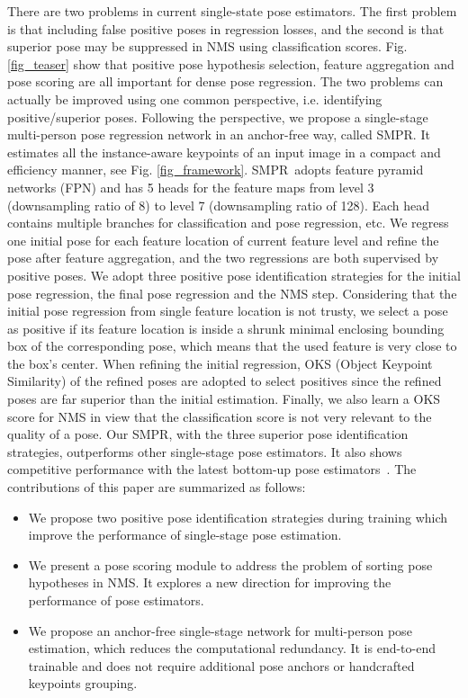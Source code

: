 \documentclass[11pt,twocolumn,journal]{IEEEtran}
\newcommand{\fig}{Fig. }
\newcommand{\SMPR}{SMPR}
\begin{document}
There are two problems in current single-state pose estimators. The first problem is that including false positive poses in regression losses, and the second is that superior pose may be suppressed in NMS using classification scores. 
\fig \ref{fig_teaser} show that positive pose hypothesis selection, feature aggregation and pose scoring are all important for dense pose regression. 
The two problems can actually be improved using one common perspective, i.e. identifying positive/superior poses. Following the perspective, we propose a single-stage multi-person pose regression network in an anchor-free way, called \SMPR. It estimates all the instance-aware keypoints of an input image in a compact and efficiency manner, see \fig \ref{fig_framework}. \SMPR~adopts feature pyramid networks (FPN) \cite{fpn17} and has 5 heads for the feature maps from level 3 (downsampling ratio of 8) to level 7 (downsampling ratio of 128).
Each head contains multiple branches for classification and pose regression, etc. 
We regress one initial pose for each feature location of current feature level and refine the pose after feature aggregation, and the two regressions are both supervised by positive poses.  
We adopt three positive pose identification strategies for the initial pose regression, the final pose regression and the NMS step. Considering that the initial pose regression from single feature location is not trusty, we select a pose as positive if its feature location is inside a shrunk minimal enclosing bounding box of the corresponding pose, which means that the used feature is very close to the box's center. When refining the initial regression, OKS (Object Keypoint Similarity) of the refined poses are adopted to select positives since the refined poses are far superior than the initial estimation. Finally, we also learn a OKS score for NMS in view that the classification score is not very relevant to the quality of a pose. 
Our \SMPR, with the three superior pose identification strategies, outperforms other single-stage pose estimators. It also shows competitive performance with the latest bottom-up pose estimators~\cite{higherhrnet2020}. The contributions of this paper are summarized as follows: 
\begin{itemize}
    \item We propose two positive pose identification strategies during training which improve the performance of single-stage pose estimation.  
\item We present a pose scoring module to address the problem of sorting pose hypotheses in NMS. It explores a new direction for improving the performance of pose estimators.
    \item We propose an anchor-free single-stage network for multi-person pose estimation, which reduces the computational redundancy. It is end-to-end trainable and does not require additional pose anchors or handcrafted keypoints grouping.
\end{itemize}
\end{document}
